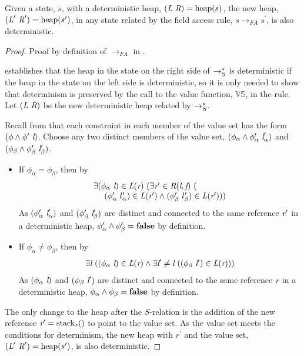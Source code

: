 \begin{lemma}
\label{lem:FA-determ}
Given a state, $s$, with a deterministic heap,
$(\cfgnt{L}\ \cfgnt{R}) =
\mathrm{heap}(s)$, the new heap,
$(\cfgnt{L}^\prime\ \cfgnt{R}^\prime) =
\mathrm{heap}(s^\prime)$, in any state related by the field
access rule, $s \rightarrow_\mathit{FA} s^\prime$,
is also deterministic.
\end{lemma}
\begin{proof}
Proof by definition of $\rightarrow_\mathit{FA}$ in .

 establishes that the heap in the state on the right side of
$\rightarrow_S^*$ is deterministic if the heap in the state on the left side
is deterministic, so it is only needed to show that determinism is
preserved by the call to the value function, $\mathbb{VS}$, in the
rule. Let $(\cfgnt{L}\ \cfgnt{R})$ be the new deterministic heap related by $\rightarrow_S^*$.

Recall from  that each constraint in each member of the value set has the form
$(\phi\wedge \phi^\prime\ \cfgnt{l})$. Choose any two distinct members of the value set, $(\phi_\alpha \wedge
\phi_\alpha^\prime\ \emph{l}_\alpha^\prime)$ and $(\phi_\beta \wedge
\phi_\beta^\prime\ \emph{l}_\beta^\prime)$.
\begin{itemize}
\item If $\phi_\alpha = \phi_\beta$, then by  
\[\begin{array}{l}
\exists (\phi_\alpha\ \emph{l}) \in \emph{L}(\emph{r})\ (\exists \emph{r}^\prime \in \emph{R}(\emph{l},\emph{f})\ (\\
\ \ \ \ (\phi_\alpha^\prime\ l_\alpha^\prime) \in \emph{L}(\emph{r}^\prime) \wedge (\phi_\beta^\prime\ l_\beta^\prime) \in \emph{L}(\emph{r}^\prime)))
\end{array}
\]
As $(\phi_\alpha^\prime\ \cfgnt{l}_\alpha^\prime)$ and $(\phi_\beta^\prime\ \emph{l}_\beta^\prime)$ are distinct and connected to the same reference $\emph{r}^\prime$ in a deterministic heap, $\phi_\alpha^\prime \wedge  \phi_\beta^\prime = \textbf{false}$ by definition.
\item If $\phi_\alpha \ne \phi_\beta$, then by  
\[\begin{array}{l}
\exists \cfgnt{l}\ ((\phi_\alpha\ \cfgnt{l}) \in \cfgnt{L}(\cfgnt{r}) \wedge \exists \cfgnt{l}^\prime \neq \cfgnt{l} \ ((\phi_\beta\ \cfgnt{l}^\prime) \in \cfgnt{L}(\cfgnt{r})))
\end{array}
\]
As $(\phi_\alpha\ \cfgnt{l})$ and $(\phi_\beta\ \cfgnt{l}^\prime)$ are distinct and connected to the same reference $\emph{r}$ in a deterministic heap, $\phi_\alpha \wedge  \phi_\beta = \textbf{false}$ by definition.
\end{itemize}
The only change to the heap after the $S$-relation is the addition of
the new reference $\emph{r}^\prime = \mathrm{stack}_{\emph{r}}()$ to
point to the value set. As the value set meets the conditions for
determinism, the new heap with $r^\prime$ and the value set,
$(\cfgnt{L}^\prime\ \cfgnt{R}^\prime) =
\mathrm{heap}(s^\prime)$, is also deterministic.
\end{proof}

